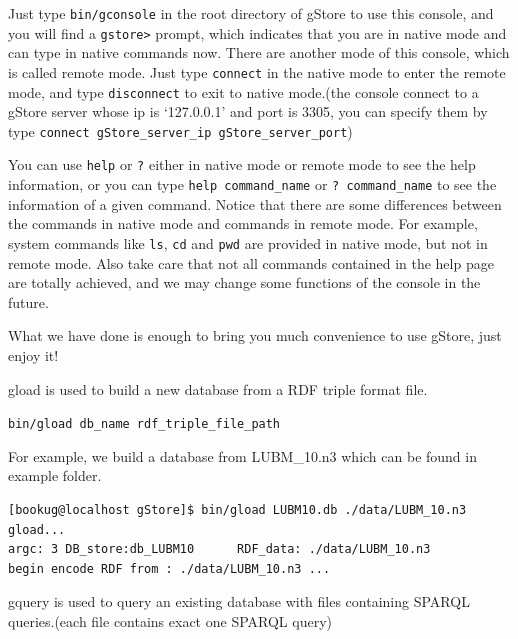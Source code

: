 \documentclass[titlepage, a4paper, 12pt]{article}
\begin{document}
Just type \texttt{bin/gconsole} in the root directory of gStore to use this console, and you will find a \texttt{gstore\textgreater{}} prompt, which indicates that you are in native mode and can type in native commands now. There are another mode of this console, which is called remote mode. Just type \texttt{connect} in the native mode to enter the remote mode, and type \texttt{disconnect} to exit to native mode.(the console connect to a gStore server whose ip is `127.0.0.1' and port is 3305, you can specify them by type \texttt{connect\ gStore\_server\_ip\ gStore\_server\_port})

You can use \texttt{help} or \texttt{?} either in native mode or remote mode to see the help information, or you can type \texttt{help\ command\_name} or \texttt{?\ command\_name} to see the information of a given command. Notice that there are some differences between the commands in native mode and commands in remote mode. For example, system commands like \texttt{ls}, \texttt{cd} and \texttt{pwd} are provided in native mode, but not in remote mode. Also take care that not all commands contained in the help page are totally achieved, and we may change some functions of the console in the future.

What we have done is enough to bring you much convenience to use gStore, just enjoy it!


gload is used to build a new database from a RDF triple format file.

\texttt{bin/gload\ db\_name\ rdf\_triple\_file\_path}

For example, we build a database from LUBM\_10.n3 which can be found in
example folder.

\begin{verbatim}
[bookug@localhost gStore]$ bin/gload LUBM10.db ./data/LUBM_10.n3
gload...
argc: 3 DB_store:db_LUBM10      RDF_data: ./data/LUBM_10.n3
begin encode RDF from : ./data/LUBM_10.n3 ...
\end{verbatim}


gquery is used to query an existing database with files containing
SPARQL queries.(each file contains exact one SPARQL query)
\end{document}
